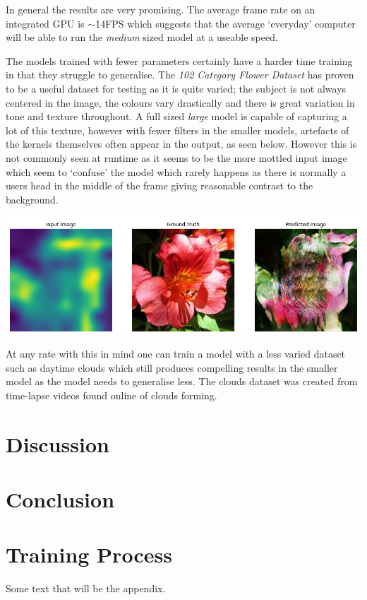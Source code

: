 \documentclass[a4paper]{article}
\begin{document}
In general the results are very promising. The average frame rate on an integrated GPU is $\sim$14FPS which suggests that the average `everyday' computer will be able to run the \textit{medium} sized model at a useable speed.

The models trained with fewer parameters certainly have a harder time training in that they struggle to generalise. The \textit{102 Category Flower Dataset}\cite{flowers_dataset} has proven to be a useful dataset for testing as it is quite varied; the subject is not always centered in the image, the colours vary drastically and there is great variation in tone and texture throughout. A full sized \textit{large} model is capable of capturing a lot of this texture, however with fewer filters in the smaller models, artefacts of the kernels themselves often appear in the output, as seen below. However this is not commonly seen at runtime as it seems to be the more mottled input image which seem to `confuse' the model which rarely happens as there is normally a users head in the middle of the frame giving reasonable contrast to the background.

\includegraphics[width=\textwidth]{artefacts}

At any rate with this in mind one can train a model with a less varied dataset such as daytime clouds which still produces compelling results in the smaller model as the model needs to generalise less. The clouds dataset was created from time-lapse videos found online of clouds forming.

\section{Discussion}

\section{Conclusion}



\medskip
\printbibliography

\appendix
\section{Training Process}
Some text that will be the appendix.
\end{document}
